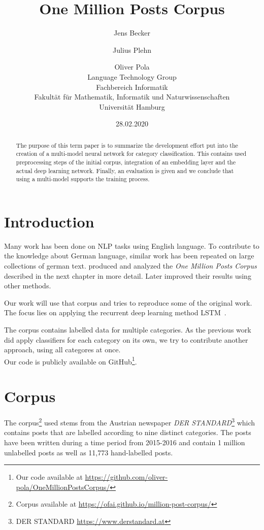 \documentclass[11pt,a4paper]{article}
\title{One Million Posts Corpus}
\author{Jens Becker \and Julius Plehn \and Oliver Pola \\ 
	Language Technology Group \\
	Fachbereich Informatik \\
	Fakultät für Mathematik, Informatik und Naturwissenschaften \\
	Universität Hamburg
}
\date{28.02.2020}
\begin{document}
\maketitle
\begin{abstract}
The purpose of this term paper is to summarize the development effort put into the creation of a multi-model neural network for category classification. This contains used preprocessing steps of the initial corpus, integration of an embedding layer and the actual deep learning network.
Finally, an evaluation is given and we conclude that using a multi-model supports the training process.

 
\end{abstract}

\section{Introduction}

Many work has been done on NLP tasks using English language.
To contribute to the knowledge about German language, similar work has been repeated on large collections of german text.
 produced and analyzed the \textit{One Million Posts Corpus} described in the next chapter in more detail. Later  improved their results using other methods.

Our work will use that corpus and tries to reproduce some of the original work.
The focus lies on applying the recurrent deep learning method LSTM~\cite{lstm}.

The corpus contains labelled data for multiple categories.
As the previous work did apply classifiers for each category on its own, we try to contribute another approach, using all categores at once.\\

Our code is publicly available on GitHub\footnote{Our code available at \url{https://github.com/oliver-pola/OneMillionPostsCorpus/}}.

\section{Corpus}
The corpus\footnote{Corpus available at \url{https://ofai.github.io/million-post-corpus/}} used stems from the Austrian newspaper \textit{DER STANDARD}\footnote{DER STANDARD \url{https://www.derstandard.at}} which contains posts that are labelled according to nine distinct categories. The posts have been written during a time period from 2015-2016 and contain 1 million unlabelled posts as well as 11,773 hand-labelled posts.
\end{document}
